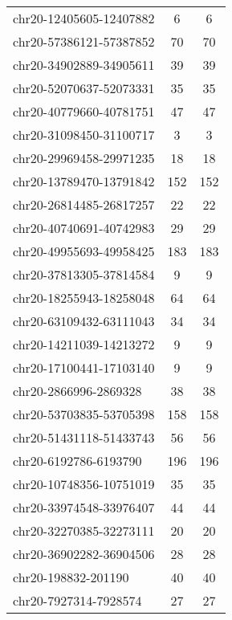 \documentclass[10pt,letterpaper]{article}
\begin{document}
{\begin{longtable}{lSS}
	chr20-12405605-12407882 & 6      & 6                     \\
	chr20-57386121-57387852 & 70     & 70                    \\
	chr20-34902889-34905611 & 39     & 39                    \\
	chr20-52070637-52073331 & 35     & 35                    \\
	chr20-40779660-40781751 & 47     & 47                    \\
	chr20-31098450-31100717 & 3      & 3                     \\
	chr20-29969458-29971235 & 18     & 18                    \\
	chr20-13789470-13791842 & 152    & 152                   \\
	chr20-26814485-26817257 & 22     & 22                    \\
	chr20-40740691-40742983 & 29     & 29                    \\
	chr20-49955693-49958425 & 183    & 183                   \\
	chr20-37813305-37814584 & 9      & 9                     \\
	chr20-18255943-18258048 & 64     & 64                    \\
	chr20-63109432-63111043 & 34     & 34                    \\
	chr20-14211039-14213272 & 9      & 9                     \\
	chr20-17100441-17103140 & 9      & 9                     \\
	chr20-2866996-2869328   & 38     & 38                    \\
	chr20-53703835-53705398 & 158    & 158                   \\
	chr20-51431118-51433743 & 56     & 56                    \\
	chr20-6192786-6193790   & 196    & 196                   \\
	chr20-10748356-10751019 & 35     & 35                    \\
	chr20-33974548-33976407 & 44     & 44                    \\
	chr20-32270385-32273111 & 20     & 20                    \\
	chr20-36902282-36904506 & 28     & 28                    \\
	chr20-198832-201190     & 40     & 40                    \\
	chr20-7927314-7928574   & 27     & 27                    \\

\end{longtable}}
\end{document}
